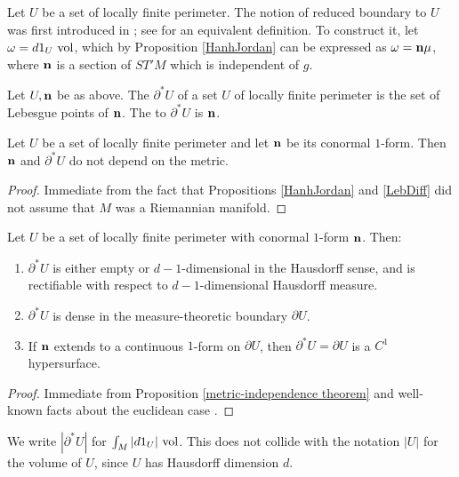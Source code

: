 Let $U$ be a set of locally finite perimeter.
The notion of reduced boundary to $U$ was first introduced in \cite{deGiorgi55}; see \cite{Battista_2021} for an equivalent definition.
To construct it, let $\omega = d1_U ~\mathrm{vol}$, which by Proposition \ref{HanhJordan} can be expressed as $\omega = \mathbf n \mu$, where $\mathbf n$ is a section of $ST'M$ which is independent of $g$.

\begin{definition}
Let $U,\mathbf n$ be as above.
The  $\partial^* U$ of a set $U$ of locally finite perimeter is the set of Lebesgue points of $\mathbf n$.
The  to $\partial^* U$ is $\mathbf n$.
\end{definition}

\begin{proposition}\label{metric-independence theorem}
Let $U$ be a set of locally finite perimeter and let $\mathbf n$ be its conormal $1$-form.
Then $\mathbf n$ and $\partial^* U$ do not depend on the metric.
\end{proposition}
\begin{proof}
Immediate from the fact that Propositions \ref{HanhJordan} and \ref{LebDiff} did not assume that $M$ was a Riemannian manifold.
\end{proof}

\begin{proposition}\label{locality of Caccioppoli}
Let $U$ be a set of locally finite perimeter with conormal $1$-form $\mathbf n$.
Then:
\begin{enumerate}
\item $\partial^* U$ is either empty or $d-1$-dimensional in the Hausdorff sense, and is rectifiable with respect to $d-1$-dimensional Hausdorff measure.
\item $\partial^* U$ is dense in the measure-theoretic boundary $\partial U$.
\item If $\mathbf n$ extends to a continuous $1$-form on $\partial U$, then $\partial^* U = \partial U$ is a $C^1$ hypersurface.
\end{enumerate}
\end{proposition}
\begin{proof}
Immediate from Proposition \ref{metric-independence theorem} and well-known facts about the euclidean case \cite[Chapters 2-4]{Giusti77} \cite{deGiorgi55}.
\end{proof}

\begin{notation}
We write $|\partial^* U|$ for $\int_M |d1_U| ~\mathrm{vol}$.
This does not collide with the notation $|U|$ for the volume of $U$, since $U$ has Hausdorff dimension $d$.
\end{notation}

